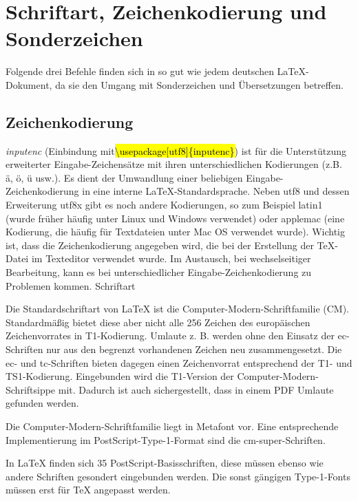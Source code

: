 
\section{Schriftart, Zeichenkodierung und Sonderzeichen}

Folgende drei Befehle finden sich in so gut wie jedem deutschen LaTeX-Dokument, da sie den Umgang mit Sonderzeichen und Übersetzungen betreffen.
\subsection{Zeichenkodierung}

\textit{inputenc} (Einbindung mit\hl{\textbackslash usepackage[utf8]\{inputenc\}}) ist für die Unterstützung erweiterter Eingabe-Zeichensätze mit ihren unterschiedlichen Kodierungen (z.B. ä, ö, ü usw.). Es dient der Umwandlung einer beliebigen Eingabe-Zeichenkodierung in eine interne LaTeX-Standardsprache. Neben utf8 und dessen Erweiterung utf8x gibt es noch andere Kodierungen, so zum Beispiel latin1 (wurde früher häufig unter Linux und Windows verwendet) oder applemac (eine Kodierung, die häufig für Textdateien unter Mac OS verwendet wurde). Wichtig ist, dass die Zeichenkodierung angegeben wird, die bei der Erstellung der TeX-Datei im Texteditor verwendet wurde. Im Austausch, bei wechselseitiger Bearbeitung, kann es bei unterschiedlicher Eingabe-Zeichenkodierung zu Problemen kommen.\cite{Ensenbach}
Schriftart

Die Standardschriftart von LaTeX ist die Computer-Modern-Schriftfamilie (CM). Standardmäßig bietet diese aber nicht alle 256 Zeichen des europäischen Zeichenvorrates in T1-Kodierung. Umlaute z. B. werden ohne den Einsatz der ec-Schriften nur aus den begrenzt vorhandenen Zeichen neu zusammengesetzt. Die ec- und tc-Schriften bieten dagegen einen Zeichenvorrat entsprechend der T1- und TS1-Kodierung. Eingebunden wird die T1-Version der Computer-Modern-Schriftsippe mit. Dadurch ist auch sichergestellt, dass in einem PDF Umlaute gefunden werden.

Die Computer-Modern-Schriftfamilie liegt in Metafont vor. Eine entsprechende Implementierung im PostScript-Type-1-Format sind die cm-super-Schriften.

In LaTeX finden sich 35 PostScript-Basisschriften, diese müssen ebenso wie andere Schriften gesondert eingebunden werden. Die sonst gängigen Type-1-Fonts müssen erst für TeX angepasst werden.

